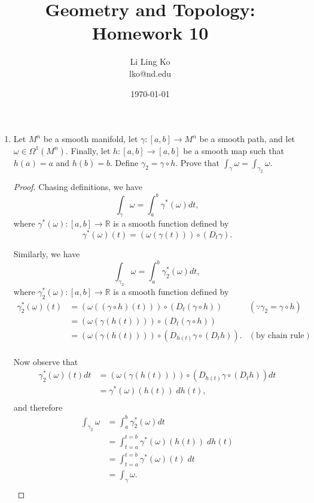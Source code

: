 \documentclass{article}
\begin{document}
\title{Geometry and Topology: Homework 10}
\author{Li Ling Ko\\ lko@nd.edu}
\date{\today}
\maketitle

\begin{enumerate}[label={\bf Q\arabic*:}]
  \item Let $M^n$ be a smooth manifold, let $\gamma:[a,b]\rightarrow M^n$
    be a smooth path, and let $\omega\in\Omega^1(M^n)$. Finally, let
    $h:[a,b]\rightarrow[a,b]$ be a smooth map such that $h(a)=a$ and
    $h(b)=b$. Define $\gamma_2=\gamma\circ h$. Prove that
    $\int_{\gamma}\omega=\int_{\gamma_2}\omega$.

    \begin{proof}
      Chasing definitions, we have
      \[\int_\gamma\omega =\int_a^b\gamma^*(\omega)dt,\]
      where $\gamma^*(\omega):[a,b]\rightarrow\mathbb{R}$ is a smooth
      function defined by
      \[\gamma^*(\omega)(t) =(\omega(\gamma(t)))\circ(D_t\gamma).\]

      Similarly, we have
      \[\int_{\gamma_2}\omega =\int_a^b\gamma_2^*(\omega)dt,\]
      where $\gamma_2^*(\omega):[a,b]\rightarrow\mathbb{R}$ is a smooth
      function defined by
      \begin{align*}
        \gamma_2^*(\omega)(t) &=(\omega((\gamma\circ h)(t)))
          \circ(D_t(\gamma\circ h)) &(\because\gamma_2=\gamma\circ h) \\
          &=(\omega(\gamma(h(t)))) \circ(D_t(\gamma\circ h)) \\
          &=(\omega(\gamma(h(t)))) \circ(D_{h(t)}\gamma\circ(D_th)).
            &(\text{by chain rule}) \\
      \end{align*}

      Now observe that
      \begin{align*}
        \gamma_2^*(\omega)(t)dt &=(\omega(\gamma(h(t))))
          \circ(D_{h(t)}\gamma\circ(D_th)) dt \\
          &=\gamma^*(\omega)(h(t))\; dh(t), \\
      \end{align*}
      and therefore
      \begin{align*}
        \int_{\gamma_2}\omega &=\int_a^b\gamma_2^*(\omega)dt \\
          &=\int^{t=b}_{t=a}\gamma^*(\omega)(h(t))\; dh(t) \\
          &=\int^{t=b}_{t=a}\gamma^*(\omega)(t)\; dt \\
          &=\int_{\gamma}\omega. \\
      \end{align*}
    \end{proof}


\end{enumerate}
\end{document}
